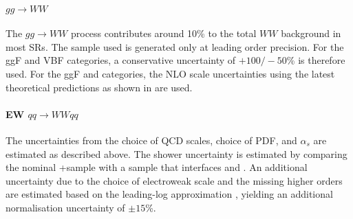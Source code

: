 

\paragraph{$gg \to WW$} 
The $gg \to WW$ process contributes around 10\% to the total $WW$ background in most SRs. The \Sherpa sample used is generated only at leading order precision. For the ggF and VBF \TwoJet categories, a conservative uncertainty of $+100/-50$\% is therefore used. For the ggF \OneJet and \TwoJet categories, the NLO scale uncertainties using the latest theoretical predictions as shown in  are used.

\paragraph{EW $qq \to WWqq$}
The uncertainties from the choice of QCD scales, choice of PDF, and $\alpha_s$ are estimated as described above.
The shower uncertainty is estimated by comparing the nominal \MADGRAPH+\PythiaEight sample with a sample that interfaces \MADGRAPH and .
An additional uncertainty due to the choice of electroweak scale and the missing higher orders are estimated based on the leading-log approximation \cite{Denner_2019}, yielding an additional normalisation uncertainty of $\pm 15$\%. 




